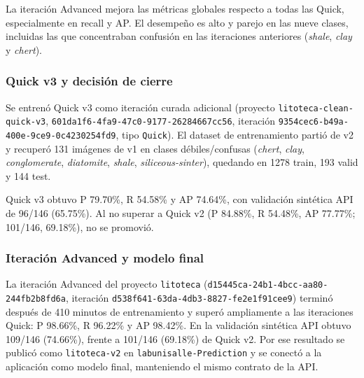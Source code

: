 La iteración Advanced mejora las métricas globales respecto a todas las Quick,
especialmente en recall y AP. El desempeño es alto y parejo en las nueve clases,
incluidas las que concentraban confusión en las iteraciones anteriores
(\emph{shale}, \emph{clay} y \emph{chert}).

\subsubsection{Quick v3 y decisión de cierre}

Se entrenó Quick v3 como iteración curada adicional (proyecto
\texttt{litoteca-clean-quick-v3}, \texttt{601da1f6-4fa9-47c0-9177-26284667cc56},
iteración \texttt{9354cec6-b49a-400e-9ce9-0c4230254fd9}, tipo \texttt{Quick}).
El dataset de entrenamiento partió de v2 y recuperó 131 imágenes de v1 en clases
débiles/confusas (\emph{chert}, \emph{clay}, \emph{conglomerate},
\emph{diatomite}, \emph{shale}, \emph{siliceous-sinter}), quedando en 1278 train,
193 valid y 144 test.

Quick v3 obtuvo P 79.70\%, R 54.58\% y AP 74.64\%, con validación sintética API
de 96/146 (65.75\%). Al no superar a Quick v2 (P 84.88\%, R 54.48\%, AP 77.77\%;
101/146, 69.18\%), no se promovió.

\subsubsection{Iteración Advanced y modelo final}

La iteración Advanced del proyecto \texttt{litoteca}
(\texttt{d15445ca-24b1-4bcc-aa80-244fb2b8fd6a}, iteración
\texttt{d538f641-63da-4db3-8827-fe2e1f91cee9}) terminó después de 410 minutos de
entrenamiento y superó ampliamente a las iteraciones Quick: P 98.66\%, R 96.22\% y
AP 98.42\%. En la validación sintética API obtuvo 109/146 (74.66\%), frente a
101/146 (69.18\%) de Quick v2. Por ese resultado se publicó como
\texttt{litoteca-v2} en \texttt{labunisalle-Prediction} y se conectó a la aplicación
como modelo final, manteniendo el mismo contrato de la API.

